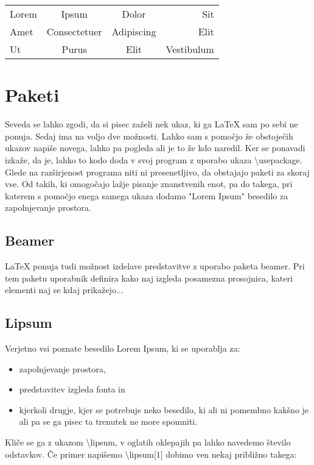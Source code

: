 \documentclass[a4paper]{book}
\newcommand\tbs{\textbackslash{}}
\begin{document}
\begin{tabular}{|l c||c|r|}
\hline
Lorem & Ipsum & Dolor & Sit \\
Amet & Consectetuer & Adipiscing & Elit \\ \hline \hline
Ut & Purus & Elit & Vestibulum \\ \hline

\end{tabular}



\section{Paketi}
Seveda se lahko zgodi, da si pisec zaželi nek ukaz, ki ga \LaTeX{} sam po sebi ne ponuja. Sedaj ima na voljo dve možnosti. Lahko sam s pomočjo že obstoječih ukazov napiše novega, lahko pa pogleda ali je to že kdo naredil. Ker se ponavadi izkaže, da je, lahko to kodo doda v svoj program z uporabo ukaza \tbs{}usepackage. Glede na razširjenost programa niti ni presenetljivo, da obstajajo paketi za skoraj vse. Od takih, ki omogočajo lažje pisanje znanstvenih enot, pa do takega, pri katerem s pomočjo enega samega ukaza dodamo "Lorem Ipsum" besedilo za zapolnjevanje prostora.

\subsection{Beamer}
\LaTeX{} ponuja tudi možnost izdelave predstavitve z uporabo paketa beamer. Pri tem paketu uporabnik definira kako naj izgleda posamezna prosojnica, kateri elementi naj se kdaj prikažejo...

\subsection{Lipsum}
Verjetno vsi poznate besedilo Lorem Ipsum, ki se uporablja za:
\begin{itemize}
\item zapolnjevanje prostora,
\item predstavitev izgleda fonta in
\item kjerkoli drugje, kjer se potrebuje neko besedilo, ki ali ni pomembno kakšno je ali pa se ga pisec ta trenutek ne more spomniti.
\end{itemize}

Kliče se ga z ukazom \tbs{}lipsum, v oglatih oklepajih pa lahko navedemo število odstavkov. 
Če primer napišemo \tbs{}lipsum[1] dobimo ven nekaj približno takega:\\
\end{document}
